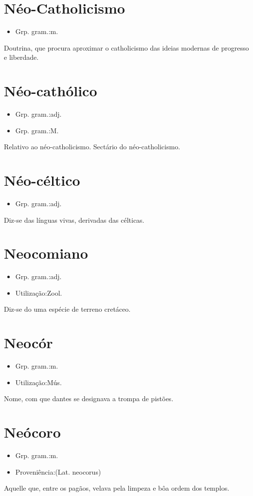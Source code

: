 \section{Néo-Catholicismo}
\begin{itemize}
\item {Grp. gram.:m.}
\end{itemize}
Doutrina, que procura aproximar o catholicismo das ideias modernas de progresso e liberdade.
\section{Néo-cathólico}
\begin{itemize}
\item {Grp. gram.:adj.}
\end{itemize}
\begin{itemize}
\item {Grp. gram.:M.}
\end{itemize}
Relativo ao néo-catholicismo.
Sectário do néo-catholicismo.
\section{Néo-céltico}
\begin{itemize}
\item {Grp. gram.:adj.}
\end{itemize}
Diz-se das línguas vivas, derivadas das célticas.
\section{Neocomiano}
\begin{itemize}
\item {Grp. gram.:adj.}
\end{itemize}
\begin{itemize}
\item {Utilização:Zool.}
\end{itemize}
Diz-se do uma espécie de terreno cretáceo.
\section{Neocór}
\begin{itemize}
\item {Grp. gram.:m.}
\end{itemize}
\begin{itemize}
\item {Utilização:Mús.}
\end{itemize}
Nome, com que dantes se designava a trompa de pistões.
\section{Neócoro}
\begin{itemize}
\item {Grp. gram.:m.}
\end{itemize}
\begin{itemize}
\item {Proveniência:(Lat. \textunderscore neocorus\textunderscore )}
\end{itemize}
Aquelle que, entre os pagãos, velava pela limpeza e bôa ordem dos templos.
